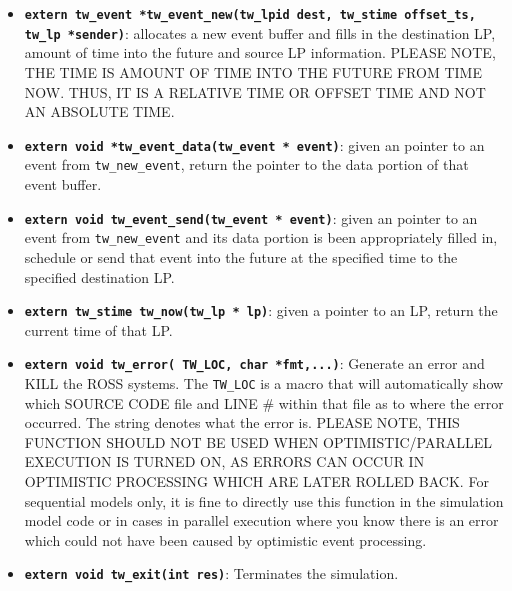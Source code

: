 \documentclass[12pt]{article}
\begin{document}
\begin{itemize}
\item {\tt\bf extern tw\_event *tw\_event\_new(tw\_lpid  dest, tw\_stime
offset\_ts, tw\_lp *sender)}: allocates a new event buffer and fills in
the destination LP, amount of time into the future and source LP
information. PLEASE NOTE, THE TIME IS AMOUNT OF TIME INTO THE FUTURE
FROM TIME NOW. THUS, IT IS A RELATIVE TIME OR OFFSET TIME AND NOT AN
ABSOLUTE TIME.

\item {\tt\bf extern void *tw\_event\_data(tw\_event * event)}: given an
pointer to an event from {\tt tw\_new\_event}, return the pointer to
the data portion of that event buffer.

\item {\tt\bf extern void tw\_event\_send(tw\_event * event)}: given an
pointer to an event from {\tt tw\_new\_event} and its data portion is
been appropriately filled in, schedule or send that event into the
future at the specified time to the specified destination LP.

\item {\tt\bf extern  tw\_stime tw\_now(tw\_lp * lp)}: given a pointer
to an LP, return the current time of that LP. 

\item {\tt\bf extern void tw\_error( TW\_LOC, char *fmt,...)}:
Generate an error and KILL the ROSS systems. The {\tt TW\_LOC} is a
macro that will automatically show which SOURCE CODE file and LINE \#
within that file as to where the error occurred. The string denotes
what the error is. PLEASE NOTE, THIS FUNCTION SHOULD NOT BE USED WHEN
OPTIMISTIC/PARALLEL EXECUTION IS TURNED ON, AS ERRORS CAN OCCUR IN
OPTIMISTIC PROCESSING WHICH ARE LATER ROLLED BACK. For sequential
models only, it is fine to directly use this function in the
simulation model code or in cases in parallel execution where you know
there is an error which could not have been caused by optimistic event
processing.

\item {\tt\bf extern void tw\_exit(int res)}: Terminates the
simulation. 

\end{itemize}

\end{document}
